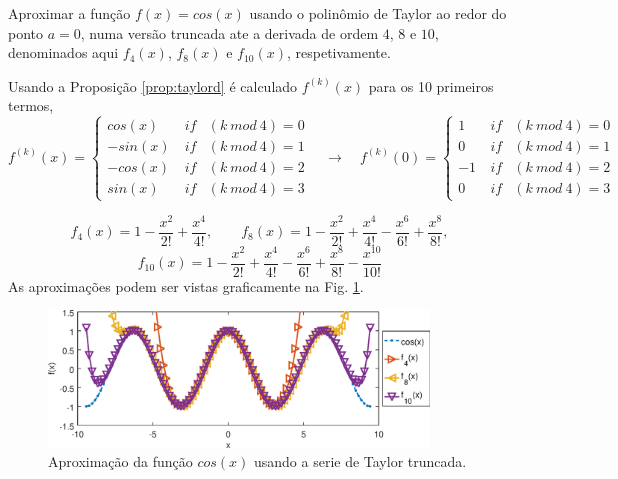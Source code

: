 \begin{example}
Aproximar a função $f(x)=cos(x)$ usando o polinômio de Taylor ao redor do ponto $a=0$,
numa versão truncada ate a derivada de ordem $4$, $8$ e $10$,
denominados aqui $f_4(x)$, $f_8(x)$ e $f_{10}(x)$, respetivamente.
\end{example}
\begin{SolutionT}
Usando a Proposição \ref{prop:taylord} é calculado $f^{(k)}(x)$ para os 10 primeiros termos,
\begin{equation}
f^{(k)}(x)=
\left\{
\begin{matrix}
cos(x) & ~if & (k~mod~4)=0\\
-sin(x)& ~if & (k~mod~4)=1\\
-cos(x)& ~if & (k~mod~4)=2\\
sin(x) & ~if & (k~mod~4)=3
\end{matrix}
\right.
\quad \rightarrow \quad
f^{(k)}(0)=
\left\{
\begin{matrix}
1 & ~if & (k~mod~4)=0\\
0& ~if & (k~mod~4)=1\\
-1& ~if & (k~mod~4)=2\\
0 & ~if & (k~mod~4)=3
\end{matrix}
\right.
\end{equation}

\begin{equation}
f_{4}(x)=
1
-\frac{x^{2}}{2!} 
+\frac{x^{4}}{4!},
\qquad 
f_{8}(x)=
1
-\frac{x^{2}}{2!} 
+\frac{x^{4}}{4!} 
-\frac{x^{6}}{6!} 
+\frac{x^{8}}{8!}, 
\end{equation}
\begin{equation}
f_{10}(x)=
1
-\frac{x^{2}}{2!} 
+\frac{x^{4}}{4!} 
-\frac{x^{6}}{6!} 
+\frac{x^{8}}{8!} 
-\frac{x^{10}}{10!} 
\end{equation}
As aproximações podem ser vistas graficamente na Fig. \ref{fig:taylore}.
\end{SolutionT}

\begin{figure}[!h]
  \centering
    \includegraphics[width=0.90\textwidth]{chapters/funcoes/mcode/taylorR1R1/taylore.eps}
  \caption{Aproximação da função $cos(x)$ usando a serie de Taylor truncada.}
    \label{fig:taylore}
\end{figure}
 


